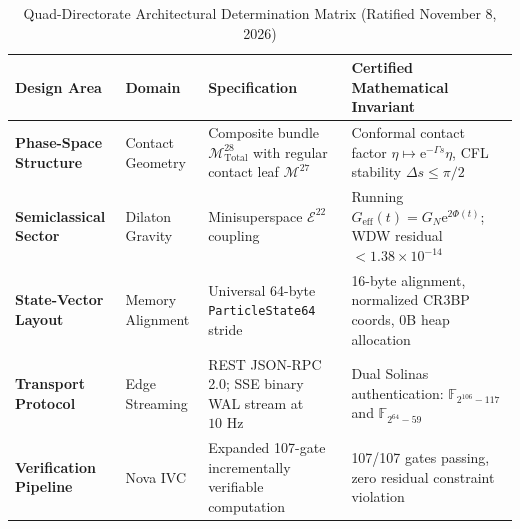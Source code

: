 \documentclass[11pt,a4paper,reqno]{article}
\theoremstyle{plain}
\theoremstyle{definition}
\theoremstyle{remark}
\numberwithin{equation}{section}
\numberwithin{table}{section}
\newcommand{\Mtotal}{\mathcal{M}_{\mathrm{Total}}^{28}}
\begin{document}
\begin{table}[H]
\centering
\small
\caption{Quad-Directorate Architectural Determination Matrix (Ratified November 8, 2026)}
\label{tab:bilateral_treaty_matrix}
\begin{tabularx}{\textwidth}{P{3.2cm}P{2.5cm}YY}
\toprule
\textbf{Design Area} & \textbf{Domain} & \textbf{Specification} & \textbf{Certified Mathematical Invariant} \\
\midrule
\textbf{Phase-Space Structure} & Contact Geometry & Composite bundle $\Mtotal$ with regular contact leaf $\mathcal{M}^{27}$ & Conformal contact factor $\eta \mapsto \mathrm{e}^{-\Gamma s}\eta$, CFL stability $\Delta s \le \pi/2$ \\
\textbf{Semiclassical Sector} & Dilaton Gravity & Minisuperspace $\mathcal{E}^{22}$ coupling & Running $G_{\mathrm{eff}}(t) = G_N \mathrm{e}^{2\Phi(t)}$; WDW residual $< 1.38 \times 10^{-14}$ \\
\textbf{State-Vector Layout} & Memory Alignment & Universal 64-byte \texttt{ParticleState64} stride & 16-byte alignment, normalized CR3BP coords, 0B heap allocation \\
\textbf{Transport Protocol} & Edge Streaming & REST JSON-RPC 2.0; SSE binary WAL stream at $10\text{ Hz}$ & Dual Solinas authentication: $\mathbb{F}_{2^{106}-117}$ and $\mathbb{F}_{2^{64}-59}$ \\
\textbf{Verification Pipeline} & Nova IVC & Expanded 107-gate incrementally verifiable computation & 107/107 gates passing, zero residual constraint violation \\
\bottomrule
\end{tabularx}
\end{table}
\end{document}
